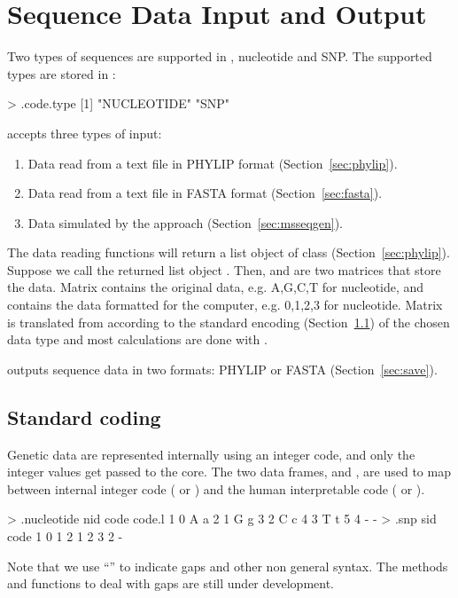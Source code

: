 \section[Sequence Data Input and Output]{Sequence Data Input and Output}
\label{sec:dataio}

Two types of sequences are supported in ,
nucleotide and SNP. The supported types are stored in :
\begin{Code}
> .code.type
[1] "NUCLEOTIDE" "SNP" 
\end{Code}
 accepts three types of input:
\begin{enumerate}
\item
Data read from a text file in PHYLIP format (Section~\ref{sec:phylip}).
\item
Data read from a text file in FASTA format (Section~\ref{sec:fasta}).
\item
Data simulated by the  approach (Section~\ref{sec:msseqgen}).
\end{enumerate}
The data reading functions  will return a list object of 
class {\color{red} } (Section~\ref{sec:phylip}).
Suppose we call the returned list object .
Then,  and  are two matrices that
store the data.
Matrix  contains the original data, e.g. A,G,C,T for
nucleotide, and
 contains the data formatted for the computer, e.g. 0,1,2,3 for nucleotide.
Matrix  is translated from 
according to the standard encoding (Section~\ref{sec:coding}) of the chosen data type and most calculations are done with .

 outputs sequence data in two formats:
PHYLIP or FASTA (Section~\ref{sec:save}).





\subsection[Standard coding]{Standard coding}
\label{sec:coding}

Genetic data are represented internally using an integer code, and only the integer values get passed to the  core.
The two data frames,  and ,
are used to map between internal integer code ( or ) and the human interpretable code ( or ).
\begin{Code}
> .nucleotide
  nid code code.l
1   0    A      a
2   1    G      g
3   2    C      c
4   3    T      t
5   4    -      -
> .snp
  sid code
1   0    1
2   1    2
3   2    -
\end{Code}
Note that we use ``\code{-}'' to indicate gaps and other non general syntax.
The methods and functions to deal with gaps are still under development.


